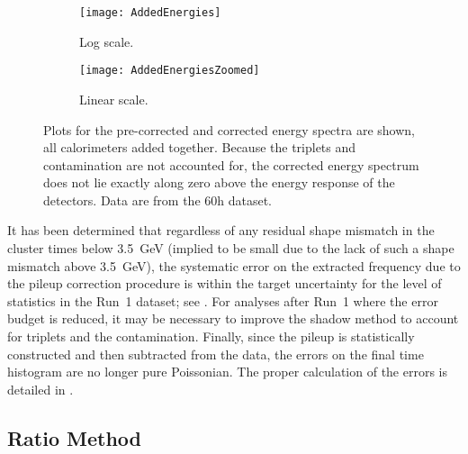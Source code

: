     \begin{figure}
    \centering
        \begin{subfigure}[]{0.45\textwidth}
            \centering
            \texttt{[image: AddedEnergies]}
            \caption{Log scale.}
        \end{subfigure}%
        \hspace{1cm}
        \begin{subfigure}[]{0.45\textwidth}
            \centering
            \texttt{[image: AddedEnergiesZoomed]}
            \caption{Linear scale.}
        \end{subfigure}
    \caption[Non-corrected and pileup corrected cluster energies]{Plots for the pre-corrected and corrected energy spectra are shown, all calorimeters added together. Because the triplets and contamination are not accounted for, the corrected energy spectrum does not lie exactly along zero above the energy response of the detectors. Data are from the 60h dataset.}
    \label{fig:AddedEnergies}
    \end{figure}



It has been determined that regardless of any residual shape mismatch in the cluster times below \SI{3.5}{\GeV} (implied to be small due to the lack of such a shape mismatch above \SI{3.5}{\GeV}), the systematic error on the extracted \wa frequency due to the pileup correction procedure is within the target uncertainty for the level of statistics in the Run~1 dataset; see . For analyses after Run~1 where the error budget is reduced, it may be necessary to improve the shadow method to account for triplets and the contamination. Finally, since the pileup is statistically constructed and then subtracted from the data, the errors on the final time histogram are no longer pure Poissonian. The proper calculation of the errors is detailed in .




\subsection{Ratio Method}
\label{sub:ratio_method}

